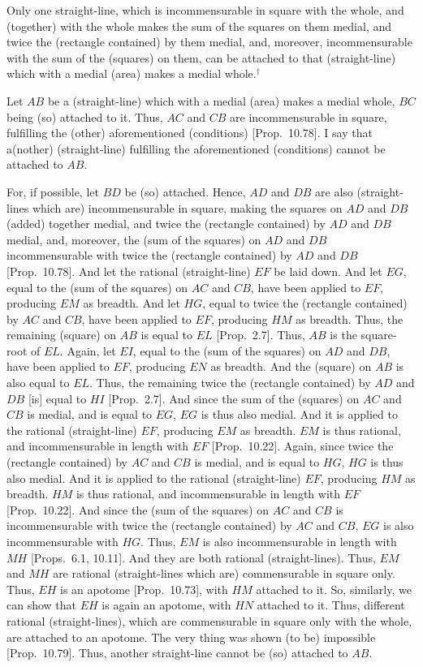 Only one straight-line, which is incommensurable
in square with the whole, and (together) with the whole makes the sum of the
squares on them medial, and twice the (rectangle contained) by
them medial, and, moreover, incommensurable with the sum of
the (squares) on them, can be attached to that (straight-line) which with
a medial (area) makes a medial whole.$^\dag$

Let $AB$ be a (straight-line) which with a medial (area) makes a medial
whole, $BC$ being (so) attached to it. Thus, $AC$ and $CB$ are incommensurable in square, fulfilling the (other) aforementioned (conditions)
[Prop.~10.78]. I say that a(nother) (straight-line)
fulfilling the aforementioned (conditions) cannot be attached to $AB$.

\epsfysize=1.6in 
\centerline{}

For, if possible, let $BD$ be (so) attached. Hence, $AD$ and
$DB$ are also (straight-lines which are) incommensurable in square, making the
squares on $AD$ and $DB$ (added) together medial, and twice the (rectangle contained) by $AD$ and $DB$ medial, and, moreover, the (sum of the squares)
on $AD$ and $DB$ incommensurable with twice the (rectangle contained)
by $AD$ and $DB$ [Prop.~10.78].
And let the rational (straight-line) $EF$ be laid down. And let $EG$, equal
to the (sum of the squares) on $AC$ and $CB$, have been applied to
$EF$, producing $EM$ as breadth. And let $HG$, equal to twice the (rectangle contained) by $AC$ and $CB$, have been applied to $EF$, producing $HM$ as breadth. Thus, the remaining (square) on  $AB$ is equal
to $EL$ [Prop.~2.7].  Thus, $AB$ is the square-root
of $EL$. Again, let $EI$, equal to the (sum of the squares) on $AD$ and $DB$, have been applied to $EF$, producing $EN$ as breadth. And the (square) on $AB$
 is also equal to $EL$. Thus, the remaining twice the
(rectangle contained) by $AD$ and $DB$ [is] equal to $HI$ [Prop.~2.7].  And since the sum of the (squares) on $AC$ and $CB$ is medial, and is equal to $EG$, $EG$ is thus also medial.
And it is applied to the rational (straight-line) $EF$, producing $EM$ as breadth. $EM$ is thus rational, and incommensurable in length with $EF$
[Prop.~10.22]. Again, since twice the
(rectangle contained) by $AC$ and $CB$ is medial, and is equal to $HG$,
$HG$ is thus also medial. And it is applied to the rational (straight-line) $EF$,
producing $HM$ as breadth. $HM$ is thus rational, and incommensurable in
length with $EF$ [Prop.~10.22]. 
And since the (sum of the squares) on
 $AC$ and $CB$ is incommensurable
with twice the (rectangle contained) by $AC$ and $CB$, $EG$ is also incommensurable with $HG$. Thus, $EM$ is also incommensurable in length
with $MH$ [Props.~6.1, 10.11]. And they are both  rational (straight-lines). Thus, $EM$ and $MH$ are rational (straight-lines which are) commensurable in square
only. Thus, $EH$ is an apotome [Prop.~10.73], with $HM$ attached to it. So, similarly, we can show that $EH$ is again an apotome, with $HN$ attached to it. Thus, different rational (straight-lines),
which are commensurable in square only with the whole, are attached to
an apotome. The very thing was shown (to be) impossible [Prop.~10.79]. Thus, another straight-line cannot
be (so) attached to $AB$.

